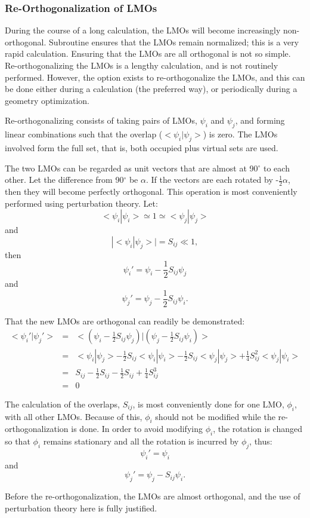 \subsubsection{Re-Orthogonalization of LMOs}\label{reorth}
During the course of a long calculation, the LMOs will become increasingly
non-orthogonal.  Subroutine  ensures that the LMOs remain
normalized; this is a very rapid calculation.  Ensuring that the LMOs are all
orthogonal is not so simple.  Re-orthogonalizing the LMOs is a lengthy
calculation, and is not routinely performed.  However, the option exists to
re-orthogonalize the LMOs, and this can be done either during a 
calculation (the preferred way), or periodically during a geometry
optimization.

Re-orthogonalizing consists of taking pairs of LMOs, $\psi_i$ and $\psi_j$, and
forming linear combinations such that the overlap ($<\!\psi_i|\psi_j\!>$) is
zero.  The LMOs involved form the full set, that is, both occupied  plus
virtual sets are used.

The two LMOs can be regarded as unit vectors that are almost at 90$^{\circ}$ to
each other.  Let the difference from  90$^{\circ}$ be $\alpha$.  If the vectors
are each rotated by -$\frac{1}{2}\alpha$, then they will become perfectly
orthogonal. This operation is most conveniently performed using perturbation
theory. Let:
$$
<\!\psi_i|\psi_i\!> \simeq 1 \simeq <\!\psi_j|\psi_j\!>
$$
and 
$$
|<\!\psi_i|\psi_j\!>| = S_{ij} \ll 1,
$$
then
$$
\psi_i' = \psi_i - \frac{1}{2}S_{ij}\psi_j
$$
and 
$$
\psi_j' = \psi_j - \frac{1}{2}S_{ij}\psi_i.
$$

That the new LMOs are orthogonal can readily be demonstrated:
\begin{eqnarray}
<\!\psi_i'|\psi_j'\!> &=&<(\psi_i - \frac{1}{2}S_{ij}\psi_j)|
(\psi_j - \frac{1}{2}S_{ij}\psi_i)\!> \nonumber \\
 &=&<\psi_i|\psi_j>-\frac{1}{2}S_{ij}<\!\psi_i|\psi_i>-
\frac{1}{2}S_{ij}<\!\psi_j|\psi_j\!>+\frac{1}{4}S_{ij}^2<\!\psi_j|\psi_i\!> 
\nonumber \\
&=& S_{ij}-\frac{1}{2}S_{ij}-\frac{1}{2}S_{ij} +\frac{1}{4}S_{ij}^3 \nonumber \\
&=& 0 \nonumber
\end{eqnarray}

The calculation of the overlaps, $S_{ij}$, is most conveniently done for one
LMO, $\phi_i$, with all other LMOs.  Because of this, $\phi_i$ should not be
modified while the re-orthogonalization is done.  In order to avoid modifying
$\phi_i$, the rotation is changed so that $\phi_i$ remains stationary and all
the rotation is incurred by $\phi_j$, thus:
$$
\psi_i' = \psi_i 
$$
and
$$
\psi_j' = \psi_j - S_{ij}\psi_i.
$$

Before the re-orthogonalization, the LMOs are almost orthogonal, and the use of
perturbation theory here is fully justified.

